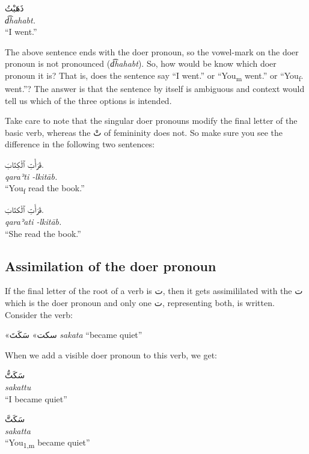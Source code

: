 \documentclass[
  10pt,
]{book}
\begin{document}
\foreignlanguage{arabic}{ذَهَبْتُ}\\
\emph{d͡hahabt.}\\
\enquote{I went.}

The above sentence ends with the doer pronoun, so the vowel-mark on the doer pronoun is not pronounced (\emph{d͡hahabt}). So, how would be know which doer pronoun it is? That is, does the sentence say \enquote{I went.} or \enquote{You\textsubscript{m} went.} or \enquote{You\textsubscript{f}. went.}? The answer is that the sentence by itself is ambiguous and context would tell us which of the three options is intended.

Take care to note that the singular doer pronouns modify the final letter of the basic verb, whereas the \foreignlanguage{arabic}{تْ} of femininity does not. So make sure you see the difference in the following two sentences:

\foreignlanguage{arabic}{قَرَأْتِ ٱلْکِتَابَ.}\\
\emph{qaraʾti -lkitāb.}\\
\enquote{You\textsubscript{f} read the book.}

\foreignlanguage{arabic}{قَرَأَتِ ٱلْکتَابَ.}\\
\emph{qaraʾati -lkitāb.}\\
\enquote{She read the book.}

\subsection{Assimilation of the doer pronoun}\label{assimilation-of-the-doer-pronoun}

If the final letter of the root of a verb is \foreignlanguage{arabic}{ت}, then it gets assimililated with the \foreignlanguage{arabic}{ت} which is the doer pronoun and only one \foreignlanguage{arabic}{ت}, representing both, is written. Consider the verb:

\foreignlanguage{arabic}{«سکت»} \foreignlanguage{arabic}{سَکَتَ} \emph{sakata} \enquote{became quiet}

When we add a visible doer pronoun to this verb, we get:

\foreignlanguage{arabic}{سَکَتُّ}\\
\emph{sakattu}\\
\enquote{I became quiet}

\foreignlanguage{arabic}{سَکَتَّ}\\
\emph{sakatta}\\
\enquote{You\textsubscript{1,m} became quiet}
\end{document}
